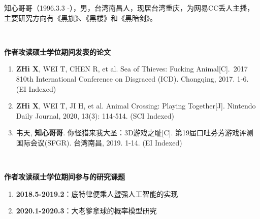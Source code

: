 
知心哥哥（1996.3.3 -），男，台湾南昌人，现居台湾重庆，为网易CC丢人主播，主要研究方向有《黑旗》、《黑楼》和《黑暗剑》。

~~

\begin{flushleft} 
  \bfseries\large 作者攻读硕士学位期间发表的论文\\
  \relax
\end{flushleft}

\begin{enumerate}
  \renewcommand{\labelenumi}{[\theenumi].}
  \item \textbf{ZHi X}, WEI T, CHEN R, et al. Sea of Thieves: Fucking Animal[C]. 2017 810th International Conference on Disgraced (ICD). Chongqing, 2017. 1-6. (EI Indexed)
  \item \textbf{ZHi X}, WEI T, JI H, et al. Animal Crossing: Playing Together[J]. Nintendo Daily Journal, 2020, 13(3): 114-514. (SCI Indexed)
  \item 韦天, \textbf{知心哥哥}. 你怪猎来我大圣：3D游戏之耻[C]. 第19届口吐芬芳游戏评测国际会议(SFGR). 台湾南昌, 2019. 1-14. (EI Indexed)
\end{enumerate}

~~

\begin{flushleft}
  \bfseries\large 作者攻读硕士学位期间参与的研究课题\\
  \relax
\end{flushleft}

\begin{enumerate}
  \renewcommand{\labelenumi}{[\theenumi].}
  \item \textbf{2018.5-2019.2}：底特律便乘人暨强人工智能的实现
  \item \textbf{2020.1-2020.3}：大老爹拿球的概率模型研究
\end{enumerate}
